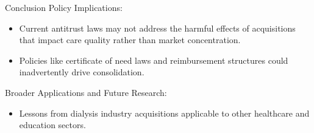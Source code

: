 \begin{frame}{Conclusion}
Policy Implications:
  \begin{itemize}
      \item Current antitrust laws may not address the harmful effects of acquisitions that impact care quality rather than market concentration.
      \item Policies like certificate of need laws and reimbursement structures could inadvertently drive consolidation.
  \end{itemize}

Broader Applications and Future Research:
  \begin{itemize}
      \item Lessons from dialysis industry acquisitions applicable to other healthcare and education sectors.
  \end{itemize}
\end{frame}